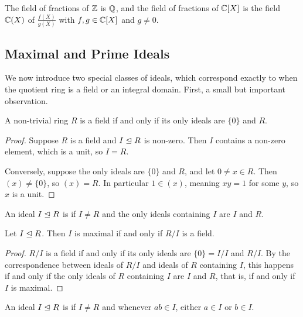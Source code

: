 \documentclass[a4paper]{scrartcl}
\begin{document}
\begin{example}
	The field of fractions of $\mathbb{Z}$ is $\mathbb{Q}$, and the field of fractions of $\mathbb{C}[X]$ is the field $\mathbb{C}(X)$ of  $\frac{f(X)}{g(X)}$ with $f, g \in \mathbb{C}[X]$ and $g \neq 0$.
\end{example}

\subsection{Maximal and Prime Ideals}

We now introduce two special classes of ideals, which correspond exactly to when the quotient ring is a field or an integral domain. First, a small but important observation.

\begin{lemma}
	A non-trivial ring $R$ is a field if and only if its only ideals are $\{0\}$ and $R$.
\end{lemma}
\begin{proof}
	Suppose $R$ is a field and $I \trianglelefteq R$ is non-zero. Then $I$ contains a non-zero element, which is a unit, so $I = R$.

	Conversely, suppose the only ideals are $\{0\}$ and $R$, and let $0 \neq x \in R$. Then $(x) \neq \{0\}$, so $(x) = R$. In particular $1 \in (x)$, meaning $xy = 1$ for some $y$, so $x$ is a unit.
\end{proof}

\begin{definition}
	An ideal $I \trianglelefteq R$ is  if $I \neq R$ and the only ideals containing $I$ are $I$ and $R$.
\end{definition}

\begin{proposition}
	Let $I \trianglelefteq R$. Then $I$ is maximal if and only if $R/I$ is a field.
\end{proposition}
\begin{proof}
	$R/I$ is a field if and only if its only ideals are $\{0\} = I/I$ and $R/I$. By the correspondence between ideals of $R/I$ and ideals of $R$ containing $I$, this happens if and only if the only ideals of $R$ containing $I$ are $I$ and $R$, that is, if and only if $I$ is maximal.
\end{proof}

\begin{definition}
	An ideal $I \trianglelefteq R$ is  if $I \neq R$ and whenever $ab \in I$, either $a \in I$ or $b \in I$.
\end{definition}
\end{document}
